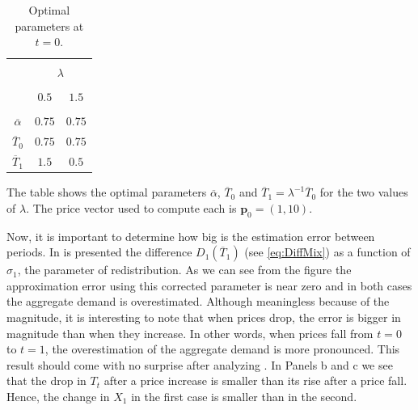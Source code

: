 \documentclass[english, a4paper,12pt]{article}
\begin{document}
	\begin{table}[H]
		\centering
		\caption{Optimal parameters at $t = 0$.}
		\label{tab:OptimalAlphaT}
		\centering
		\begin{tabular}{ccc}
		\hline\hline
														\\[-2ex]
							&	\multicolumn{2}{c}{$\lambda$}	\\\cline{2-3}
														\\[-2ex]
							&	$0.5$		&	$1.5$	\\ \hline
														\\[-2ex]
			$\overline{\alpha}$	&	$0.75$		&	$0.75$	\\[1ex]
			$\overline{T}_{0}$	&	$0.75$		&	$0.75$	\\[1ex]
			$\overline{T}_{1}$	&	$1.5$		&	$0.5$	\\[.5ex]
		\hline\hline
		\end{tabular} \vspace{2ex}
	
		\begin{minipage}{.6\textwidth} \scriptsize
			The table shows the optimal parameters $\overline{\alpha}$, $\overline{T}_{0}$ and $\overline{T}_{1} = \lambda^{-1} \overline{T}_{0}$ for the two values of $\lambda$. The price vector used to compute each is $\mathbf{p}_{0} = (1,10)$.
		\end{minipage}
	\end{table}
Now, it is important to determine how big is the estimation error between periods. In  is presented the difference $D_{1}(\overline{T}_{1})$ (see \eqref{eq:DiffMix}) as a function of $\sigma_{1}$, the parameter of redistribution. As we can see from the figure the approximation error using this corrected parameter is near zero and in both cases the aggregate demand is overestimated. Although meaningless because of the magnitude, it is interesting to note that when prices drop, the error is bigger in magnitude than when they increase. In other words, when prices fall from $t=0$ to $t = 1$, the overestimation of the aggregate demand is more pronounced. This result should come with no surprise after analyzing . In Panels b and c we see that the drop in $T_{t}$ after a price increase is smaller than its rise after a price fall. Hence, the change in $X_{1}$ in the first case is smaller than in the second. 
\end{document}
